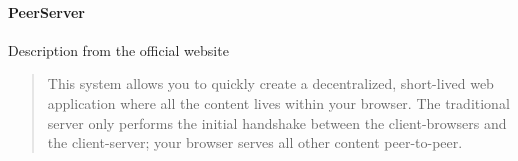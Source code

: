 \paragraph{PeerServer}
Description from the official website \cite{Server2013PeerServer}
\blockquote{This system allows you to quickly create a decentralized, short-lived web application where all the content lives within your browser. The traditional server only performs the initial handshake between the client-browsers and the client-server; your browser serves all other content peer-to-peer.}

